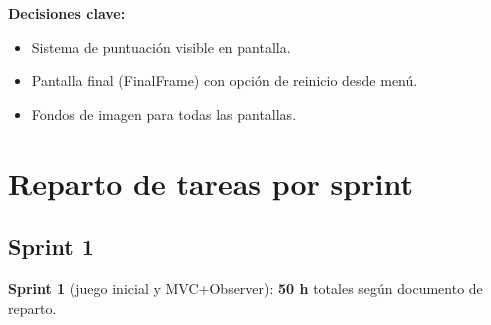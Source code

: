 \documentclass[12pt, a4paper]{article}
\begin{document}
\textbf{Decisiones clave:}
\begin{itemize}[leftmargin=2em]
    \item Sistema de puntuación visible en pantalla.
    \item Pantalla final (FinalFrame) con opción de reinicio desde menú.
    \item Fondos de imagen para todas las pantallas.
\end{itemize}

\section{Reparto de tareas por sprint}
\label{sec:reparto}


\subsection{Sprint 1}

\textbf{Sprint 1} (juego inicial y MVC+Observer): \textbf{50 h} totales según documento de reparto.
\end{document}
